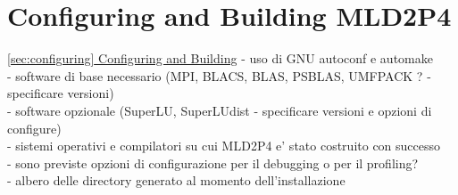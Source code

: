 \section{Configuring and Building MLD2P4\label{sec:configuring}}
         {\underline{\ref{sec:configuring} Configuring and Building}}
    - uso di GNU autoconf e automake \\
    - software di base necessario (MPI, BLACS, BLAS, PSBLAS, UMFPACK ? - specificare versioni)\\
    - software opzionale (SuperLU, SuperLUdist - specificare versioni e opzioni di configure)\\
    - sistemi operativi e compilatori su cui MLD2P4 e' stato costruito con successo \\
    - sono previste opzioni di configurazione per il debugging o per il profiling? \\
    - albero delle directory generato al momento dell'installazione\\
